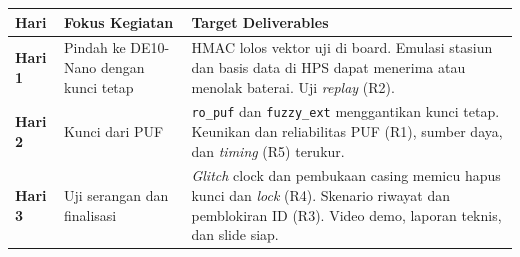 \documentclass[11pt,a4paper]{article}
\newcommand{\hdr}[1]{\cellcolor{hdrgreen}\textbf{#1}}
\renewcommand{\arraystretch}{1.3}
\begin{document}
\begin{center}
\small
\renewcommand{\arraystretch}{1.15}
\begin{tabularx}{\linewidth}{|>{\centering\arraybackslash}p{1.4cm}|>{\raggedright\arraybackslash}p{4.0cm}|X|}
\hline
\hdr{Hari} & \hdr{Fokus Kegiatan} & \hdr{Target Deliverables} \\ \hline
\textbf{Hari 1} & Pindah ke DE10-Nano dengan kunci tetap & HMAC lolos vektor uji di board. Emulasi stasiun dan basis data di HPS dapat menerima atau menolak baterai. Uji \emph{replay} (R2). \\ \hline
\textbf{Hari 2} & Kunci dari PUF & \texttt{ro\_puf} dan \texttt{fuzzy\_ext} menggantikan kunci tetap. Keunikan dan reliabilitas PUF (R1), sumber daya, dan \emph{timing} (R5) terukur. \\ \hline
\textbf{Hari 3} & Uji serangan dan finalisasi & \emph{Glitch} clock dan pembukaan casing memicu hapus kunci dan \emph{lock} (R4). Skenario riwayat dan pemblokiran ID (R3). Video demo, laporan teknis, dan slide siap. \\ \hline
\end{tabularx}
\end{center}
\end{document}

